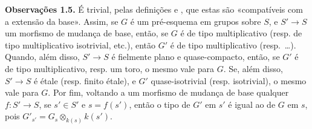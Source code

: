 \medskip
\noindent{}\textbf{Observações 1.5.}
É trivial, pelas definições
 e
, que estas são
«compatíveis com a extensão da base». Assim, se \(G\) é um
pré-esquema em grupos sobre \(S\), e \(S'\to S\) um morfismo de
mudança de base, então, se \(G\) é de tipo multiplicativo (resp. de
tipo multiplicativo isotrivial, etc.), então \(G'\) é de tipo
multiplicativo (resp.\ \dots).
Quando, além disso,
\(S'\to S\) é fielmente plano e quase-compacto, então, se \(G'\)
é de tipo multiplicativo, resp. um toro, o mesmo vale para \(G\).
Se, além disso, \(S'\to S\) é étale (resp. finito étale), e \(G'\)
quase-isotrivial (resp. isotrivial), o mesmo vale para \(G\).
Por fim, voltando a um
morfismo de mudança de base qualquer \(f:S'\to S\), se \(s'\in S'\)
e \(s=f(s')\), então o tipo de \(G'\) em \(s'\) é igual ao de
\(G\) em \(s\), pois \(G'_{s'}=G_s\otimes_{k(s)}k(s')\).

